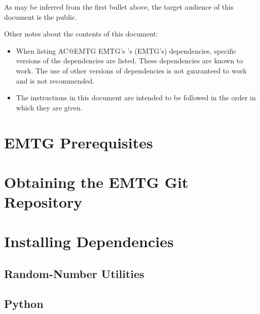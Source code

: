 \documentclass[11pt]{article}
\makeatletter
\newcommand{\acposs}[1]{%
	\expandafter\ifx\csname AC@#1\endcsname\AC@used
	\acs{#1}'s%
	\else
	\aclu{#1}'s (\acs{#1}'s)%
	\fi
}
\makeatother
\begin{document}
\noindent As may be inferred from the first bullet above, the target audience of this document is the public.

Other notes about the contents of this document:

\begin{itemize}
	\item When listing \acposs{EMTG} dependencies, specific versions of the dependencies are listed. These dependencies are known to work. The use of other versions of dependencies is not guaranteed to work and is not recommended.
	\item The instructions in this document are intended to be followed in the order in which they are given.
\end{itemize}

\section{EMTG Prerequisites}
\label{sec:install_prerequisites}



\section{Obtaining the EMTG Git Repository}
\label{sec:obtaining_emtg}



\section{Installing Dependencies}
\label{sec:obtaining_dependencies}


\subsection{Random-Number Utilities}
\label{sec:randutils}



\subsection{Python}
\label{sec:python}
\end{document}
